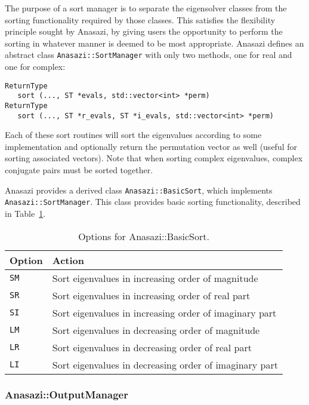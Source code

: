 The purpose of a sort manager is to separate the eigensolver classes from the
sorting functionality required by those classes. This satisfies the flexibility
principle sought by Anasazi, by giving users the opportunity to perform the
sorting in whatever manner is deemed to be most appropriate. Anasazi defines an
abstract class \verb!Anasazi::SortManager! with only two methods, one for real
and one for complex:
\begin{verbatim}
ReturnType  
   sort (..., ST *evals, std::vector<int> *perm) 
ReturnType 
   sort (..., ST *r_evals, ST *i_evals, std::vector<int> *perm)
\end{verbatim}
Each of these sort routines will sort the eigenvalues according to some
implementation and optionally return the permutation vector as well (useful for
sorting associated vectors). Note that when sorting complex eigenvalues, complex
conjugate pairs must be sorted together.

Anasazi provides a derived class \verb!Anasazi::BasicSort!, which implements
\verb!Anasazi::SortManager!. This class provides basic sorting functionality,
described in Table~\ref{tab:anasazi:sm}.

\begin{table}
\begin{center}
\begin{tabular}{| p{2cm} l |}
\hline
Option & Action \\
\hline
{\tt SM} & Sort eigenvalues in increasing order of magnitude \\
{\tt SR} & Sort eigenvalues in increasing order of real part \\
{\tt SI} & Sort eigenvalues in increasing order of imaginary part \\
{\tt LM} & Sort eigenvalues in decreasing order of magnitude \\
{\tt LR} & Sort eigenvalues in decreasing order of real part \\
{\tt LI} & Sort eigenvalues in decreasing order of imaginary part \\
\hline
\end{tabular}
\caption{Options for Anasazi::BasicSort.}
\label{tab:anasazi:sm}
\end{center}
\end{table}


\subsubsection{Anasazi::OutputManager}
\label{sec:anasazi:om}

